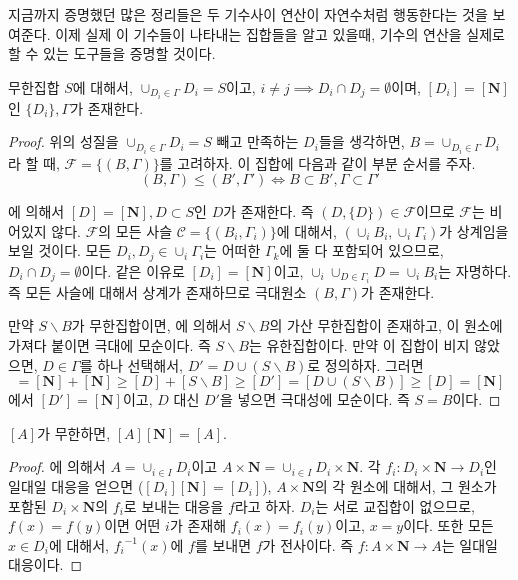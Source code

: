 \begin{remark}
	지금까지 증명했던 많은 정리들은 두 기수사이 연산이 자연수처럼 행동한다는 것을 보여준다.
	이제 실제 이 기수들이 나타내는 집합들을 알고 있을때, 기수의 연산을 실제로 할 수 있는 도구들을 증명할 것이다.
\end{remark}
\begin{lemma}
\label{countablecovering}
	무한집합 $S$에 대해서, $\cup_{D_i \in \Gamma} D_i = S$이고, $i \neq j \implies D_i \cap D_j = \emptyset$이며,
	$[D_i] = [\mathbf{N}]$인 $\{D_i\}, \Gamma$가 존재한다.
\end{lemma}
\begin{proof}
	위의 성질을 $\cup_{D_i \in \Gamma} D_i = S$ 빼고 만족하는 $D_i$들을 생각하면, $B = \cup_{D_i \in \Gamma} D_i$라 할 때,
	$\mathscr{F} = \{(B, \Gamma)\}$를 고려하자.
	이 집합에 다음과 같이 부분 순서를 주자.
	\begin{equation}
		(B, \Gamma) \leq (B', \Gamma') \iff B \subset B', \Gamma \subset \Gamma'
	\end{equation}

	에 의해서 $[D] = [\mathbf{N}], D \subset S$인 $D$가 존재한다.
	즉 $(D, \{D\}) \in \mathscr{F}$이므로 $\mathscr{F}$는 비어있지 않다.
	$\mathscr{F}$의 모든 사슬 $\mathscr{C} = \{(B_i, \Gamma_i)\}$에 대해서, $(\cup_i B_i, \cup_i \Gamma_i)$가 상계임을 보일 것이다.
	모든 $D_i, D_j \in \cup_i \Gamma_i$는 어떠한 $\Gamma_k$에 둘 다 포함되어 있으므로, $D_i \cap D_j = \emptyset$이다.
	같은 이유로 $[D_i] = [\mathbf{N}]$이고, $\cup_i \cup_{D \in \Gamma_i} D = \cup_i B_i$는 자명하다.
	즉 모든 사슬에 대해서 상계가 존재하므로 극대원소 $(B, \Gamma)$가 존재한다.

	만약 $S \backslash B$가 무한집합이면, 에 의해서 $S \backslash B$의 가산 무한집합이 존재하고, 이 원소에
	가져다 붙이면 극대에 모순이다.
	즉 $S \backslash B$는 유한집합이다.
	만약 이 집합이 비지 않았으면, $D \in \Gamma$를 하나 선택해서, $D' = D \cup (S \backslash B)$로 정의하자.
	그러면
	\begin{equation}
		[\mathbf{N}] = [\mathbf{N}] + [\mathbf{N}] \geq [D] + [S \backslash B] \geq [D'] = [D \cup (S \backslash B)] \geq [D] = [\mathbf{N}]
	\end{equation}
	에서 $[D'] = [\mathbf{N}]$이고, $D$ 대신 $D'$을 넣으면 극대성에 모순이다.
	즉 $S = B$이다.
\end{proof}
\begin{theorem}
	$[A]$가 무한하면, $[A][\mathbf{N}] = [A]$.
\end{theorem}
\begin{proof}
	에 의해서 $A = \cup_{i \in I} D_i$이고 $A \times \mathbf{N} = \cup_{i \in I} D_i \times \mathbf{N}$.
	각 $f_i : D_i \times \mathbf{N} \to D_i$인 일대일 대응을 얻으면 ($[D_i][\mathbf{N}] = [D_i]$), $A \times \mathbf{N}$의 각 원소에 대해서,
	그 원소가 포함된 $D_i \times \mathbf{N}$의 $f_i$로 보내는 대응을 $f$라고 하자.
	$D_i$는 서로 교집합이 없으므로, $f(x) = f(y)$이면 어떤 $i$가 존재해 $f_i(x) = f_i(y)$이고, $x=y$이다.
	또한 모든 $x \in D_i$에 대해서, ${f_i}^{-1}(x)$에 $f$를 보내면 $f$가 전사이다.
	즉 $f : A \times \mathbf{N} \to A$는 일대일 대응이다.
\end{proof}
